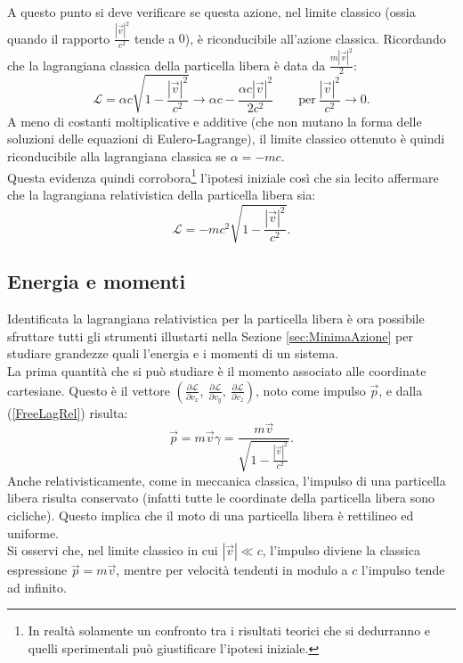 A questo punto si deve verificare se questa azione, nel limite classico (ossia quando il rapporto $\frac{|\vec{v}|^2}{c^2}$ tende a $0$), è riconducibile all'azione classica. Ricordando che la lagrangiana classica della particella libera è data da $\frac{m|\vec{v}|^2}{2} $:
\begin{equation*}
    \mathcal{L} =\alpha c \sqrt{1-\frac{|\vec{v}|^2}{c^2}}\longrightarrow \alpha c - \frac{\alpha c |\vec{v}|^2}{2c^2}\qquad \text{per}\ \frac{|\vec{v}|^2}{c^2}\rightarrow 0.
\end{equation*}
A meno di costanti moltiplicative e additive (che non mutano la forma delle soluzioni delle equazioni di Eulero-Lagrange), il limite classico ottenuto è quindi riconducibile alla lagrangiana classica se $\alpha=-mc$.\\
Questa evidenza quindi corrobora\footnote{In realtà solamente un confronto tra i risultati teorici che si dedurranno e quelli sperimentali può giustificare l'ipotesi iniziale.} l'ipotesi iniziale così che sia lecito affermare che la lagrangiana relativistica della particella libera sia:
\begin{equation}\label{FreeLagRel}
    \mathcal{L} = -mc^2\sqrt{1-\frac{|\vec{v}|^2}{c^2}}.
\end{equation}
\subsection{Energia e momenti}\label{sec:LagRelEnMo}
Identificata la lagrangiana relativistica per la particella libera è ora possibile sfruttare tutti gli strumenti illustarti nella Sezione \ref{sec:MinimaAzione} per studiare grandezze quali l'energia e i momenti di un sistema.\\

La prima quantità che si può studiare è il momento associato alle coordinate cartesiane. Questo è il vettore  $(\frac{\partial \mathcal{L} }{\partial v_x},\ \frac{\partial \mathcal{L} }{\partial v_y},\ \frac{\partial \mathcal{L} }{\partial v_z})$, noto come impulso $\vec p$, e dalla (\ref{FreeLagRel}) risulta:
\begin{equation}
    \vec{p}=m\vec{v}\gamma=\frac{m\vec{v}}{\sqrt{1-\frac{|\vec{v}|^2}{c^2}}}.
    \label{impulsoRel}
\end{equation}
Anche relativisticamente, come in meccanica classica, l'impulso di una particella libera risulta conservato (infatti tutte le coordinate della particella libera sono cicliche). Questo implica che il moto di una particella libera è rettilineo ed uniforme.\\
Si osservi che, nel limite classico in cui $|\vec{v}|\ll c$, l'impulso diviene la classica espressione $\vec p=m\vec v$, mentre per velocità tendenti in modulo a $c$ l'impulso tende ad infinito.\\

